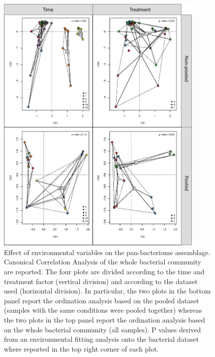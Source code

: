 \begin{figure}[!tb]
	\centering
	\includegraphics[width=0.9\textwidth]{./figures/Chapter_3/Fig7.eps}
  	\caption{Effect of environmental variables on the pan-bacteriome assemblage. Canonical Correlation Analysis of the whole bacterial community are reported. The four plots are divided according to the time and treatment factor (vertical division) and according to the dataset used (horizontal division). In particular, the two plots in the bottom panel report the ordination analysis based on the pooled dataset (samples with the same conditions were pooled together) whereas the two plots in the top panel report the ordination analysis based on the whole bacterial community (all samples). P values derived from an environmental fitting analysis onto the bacterial dataset where reported in the top right corner of each plot. \label{fig:7rom}}
\end{figure}

